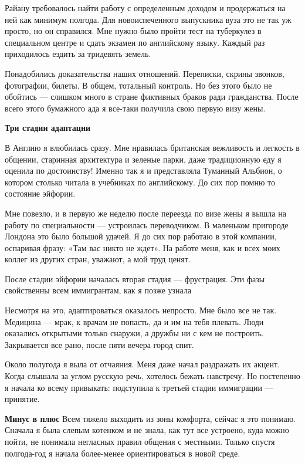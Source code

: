 Райану требовалось найти работу с определенным доходом и продержаться на ней как минимум полгода. Для новоиспеченного выпускника вуза это не так уж просто, но он справился. Мне нужно было пройти тест на туберкулез в специальном центре и сдать экзамен по английскому языку. Каждый раз приходилось ездить за тридевять земель.

Понадобились доказательства наших отношений. Переписки, скрины звонков, фотографии, билеты. В общем, тотальный контроль. Но без этого было не обойтись — слишком много в стране фиктивных браков ради гражданства. После всего этого бумажного ада я все-таки получила свою первую визу жены.

\textbf{Три стадии адаптации}

В Англию я влюбилась сразу. Мне нравилась британская вежливость и легкость в общении, старинная архитектура и зеленые парки, даже традиционную еду я оценила по достоинству! Именно так я и представляла Туманный Альбион, о котором столько читала в учебниках по английскому. До сих пор помню то состояние эйфории.

Мне повезло, и в первую же неделю после переезда по визе жены я вышла на работу по специальности — устроилась переводчиком. В маленьком пригороде Лондона это было большой удачей. Я до сих пор работаю в этой компании, оспаривая фразу: «Там вас никто не ждет». На работе меня, как и всех моих коллег из других стран, уважают, а мой труд ценят.

\begin{fancyquotes}
    После стадии эйфории началась вторая стадия — фрустрация. Эти фазы свойственны всем иммигрантам, как я позже узнала
\end{fancyquotes}

Несмотря на это, адаптироваться оказалось непросто. Мне было все не так. Медицина — мрак, к врачам не попасть, да и им на тебя плевать. Люди оказались открытыми только снаружи, а дружбы ни с кем не построить. Закрывается все рано, после пяти вечера город спит.

Около полугода я выла от отчаяния. Меня даже начал раздражать их акцент. Когда слышала за углом русскую речь, хотелось бежать навстречу. Но постепенно я начала ко всему привыкать: подступила к третьей стадии иммиграции — принятие.

\textbf{Минус в плюс}
Всем тяжело выходить из зоны комфорта, сейчас я это понимаю. Сначала я была слепым котенком и не знала, как тут все устроено, куда можно пойти, не понимала негласных правил общения с местными. Только спустя полгода-год я начала более-менее ориентироваться в новой среде.

